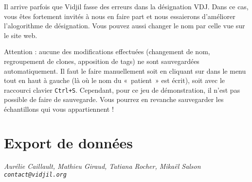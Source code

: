 \documentclass[11pt]{article}
\begin{document}
\bigskip

Il arrive parfois que Vidjil fasse des erreurs dans la désignation VDJ.
Dans ce cas, vous êtes fortement invités à nous en faire part et nous
essaierons d'améliorer l'alogorithme de désignation. Vous pouvez aussi
changer le nom par celle vue sur le site web.


Attention : aucune des modifications effectuées (changement de nom,
regroupement de clones, apposition de tags) ne sont sauvegardées
automatiquement.
Il faut le faire manuellement soit en cliquant sur  dans le
menu tout en haut à gauche (là où le nom du «~patient~» est écrit), soit avec
le raccourci clavier \texttt{Ctrl+S}.
Cependant, pour ce jeu de démonstration, il n'est pas possible de faire de
sauvegarde. Vous pourrez en revanche sauvegarder les échantillons qui vous
appartiennent !

\section{Export de données}


\vfill
\flushright \it Aurélie Caillault, Mathieu Giraud, Tatiana Rocher, Mikaël Salson
\\ \texttt{contact@vidjil.org}
\end{document}
